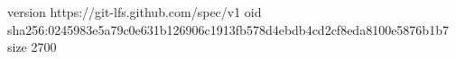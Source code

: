 version https://git-lfs.github.com/spec/v1
oid sha256:0245983e5a79c0e631b126906c1913fb578d4ebdb4cd2cf8eda8100e5876b1b7
size 2700
